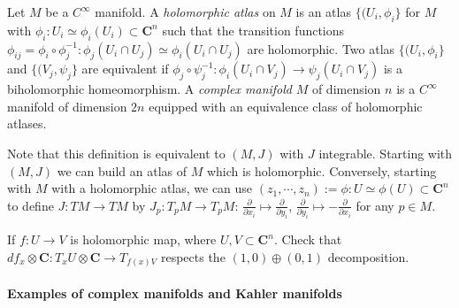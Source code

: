 \documentclass[
11pt, %
letterpaper， %
oneside, %
headinclude,footinclude, %
BCOR5mm, %
]{scrartcl}
\newcommand{\C}{{\mathbf{C}}}
\newcommand{\its}{\textit}
\begin{document}
\begin{definition}
	Let $M$ be a $C^{\infty}$ manifold. A \its {holomorphic atlas} on $M$ is an atlas $\{(U_i, \phi_i \}$ for $M$ with $\phi_i: U_i \simeq \phi_i(U_i)\subset \C^n$ such that the transition functions $\phi_{ij}=\phi_i\circ \phi_j^{-1}: \phi_j (U_i\cap U_j)\simeq \phi_i (U_i\cap U_j)$ are holomorphic. Two atlas $\{(U_i, \phi_i \}$ and $\{(V_j, \psi_j \}$ are equivalent if $\phi_j\circ \psi_j^{-1}:\phi_i( U_i\cap V_j)\to \psi_j( U_i\cap V_j) $ is a biholomorphic homeomorphism. 
	A \its{complex manifold} $M$ of dimension $n$ is a  $C^{\infty}$ manifold of dimension $2n$ equipped with an equivalence class of holomorphic atlases. 
\end{definition}
\begin{rem}
	Note that this definition is equivalent to $(M,J)$ with $J$ integrable. Starting with $(M,J)$ we can build an atlas of $M$ which is holomorphic. Conversely, starting with $M$ with a holomorphic atlas, we can use $(z_1,\cdots, z_n):= \phi : U\simeq \phi(U) \subset \C^n$ to define $J: TM\to TM$ by $J_p:T_pM \to T_pM$: $\frac{\partial}{\partial x_i}\mapsto \frac{\partial}{\partial y_i}$, $\frac{\partial}{\partial y_i}\mapsto -\frac{\partial}{\partial x_i}$ for any $p\in M$.
	\begin{exercise}
		If $f:U\to V$ is holomorphic map, where $U, V\subset \C^n$. Check that $df_{x}\otimes \C : T_xU\otimes \C \to T_{f(x)V}$ respects the $(1,0)\oplus (0,1)$ decomposition.
	\end{exercise}

\end{rem}
\paragraph{Examples of complex manifolds and Kahler manifolds}
\end{document}
